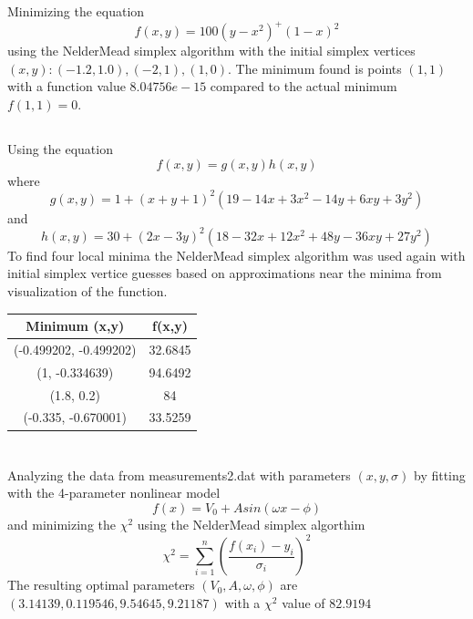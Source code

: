 \documentclass[10pt,a4paper]{article}
\begin{document}
\section{}
\subsection{}
Minimizing the equation 
\begin{equation}
f(x,y) = 100(y-x^2)^ + (1-x)^2
\end{equation}
using the NelderMead simplex algorithm with the initial simplex vertices $ (x,y) : {(-1.2,1.0), (-2,1) ,(1,0)}$. The minimum found is points $(1,1)$ with a function value $8.04756e-15$ compared to the actual minimum $f(1,1) = 0$.

\subsection{}
Using the equation 
\begin{equation}
		f(x,y) = g(x,y)h(x,y)
\end{equation}
where
\begin{equation}
	g(x,y) = 1 + (x+y+1)^2(19-14x+3x^2 -14y+6xy+3y^2)
\end{equation}
and
\begin{equation}
	h(x,y) = 30 + (2x-3y)^2(18-32x+12x^2+48y-36xy+27y^2)
\end{equation}
To find four local minima the NelderMead simplex algorithm was used again with initial simplex vertice guesses based on approximations near the minima from visualization of the function.

\begin{tabular}{|c|c|}
\hline 
Minimum (x,y) & f(x,y) \\ 
\hline 
(-0.499202, -0.499202) &  32.6845 \\ 
\hline 
(1, -0.334639) & 94.6492
 \\ 
\hline 
(1.8, 0.2) & 84 \\ 
\hline 
 (-0.335, -0.670001) & 33.5259 \\ 
\hline 
\end{tabular} 

\section{}
Analyzing the data from measurements2.dat with parameters $(x,y,\sigma)$ by fitting with the 4-parameter nonlinear model
\begin{equation}
	f(x) = V_0 + Asin(\omega x - \phi)
\end{equation}
and minimizing the $\chi^2$ using the NelderMead simplex algorthim
\begin{equation}
	\chi^2 = \sum_{i=1}^{n} (\frac{f(x_i) - y_i}{\sigma_i})^2
\end{equation}
The resulting optimal parameters $(V_0, A, \omega, \phi)$ are $ (3.14139, 0.119546, 9.54645, 9.21187)$ with a $\chi^2$ value of $82.9194$
\end{document}
